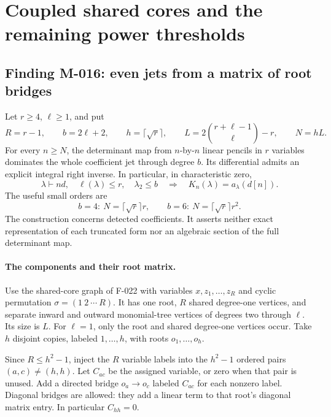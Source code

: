 \section{Coupled shared cores and the remaining power thresholds}

\subsection*{Finding M-016: even jets from a matrix of root bridges}
Let \(r\geq4\), \(\ell\geq1\), and put
\[
 R=r-1,\qquad b=2\ell+2,\qquad h=\lceil\sqrt r\rceil,
 \qquad
 L=2\binom{r+\ell-1}{\ell}-r,\qquad N=hL.
\]
For every \(n\geq N\), the determinant map from
\(n\)-by-\(n\) linear pencils in \(r\) variables dominates
the whole coefficient jet through degree \(b\).
Its differential admits an explicit integral right inverse.
In particular, in characteristic zero,
\begin{equation}\label{eq:M016K}
 \lambda\vdash nd,\quad\ell(\lambda)\leq r,\quad\lambda_2\leq b
       \quad\Longrightarrow\quad K_n(\lambda)=a_\lambda(d[n]).
\end{equation}
The useful small orders are
\[
       b=4:\ N=\lceil\sqrt r\rceil r,
       \qquad b=6:\ N=\lceil\sqrt r\rceil r^2.
                                                               \tag{M-016.1}
\]
The construction concerns detected coefficients. It asserts
neither exact representation of each truncated form nor
an algebraic section of the full determinant map.

\paragraph{The components and their root matrix.}
Use the shared-core graph of F-022 with variables
\(x,z_1,\ldots,z_R\) and cyclic permutation
\(\sigma=(1\ 2\ \cdots\ R)\). It has one root,
\(R\) shared degree-one vertices, and separate inward and
outward monomial-tree vertices of degrees two through \(\ell\).
Its size is \(L\). For \(\ell=1\), only the root and
shared degree-one vertices occur.
Take \(h\) disjoint copies, labeled \(1,\ldots,h\),
with roots \(o_1,\ldots,o_h\).

Since \(R\leq h^2-1\), inject the \(R\) variable labels
into the \(h^2-1\) ordered pairs \((a,c)\ne(h,h)\).
Let \(C_{ac}\) be the assigned variable, or zero when
that pair is unused. Add a directed bridge
\(o_a\longrightarrow o_c\) labeled \(C_{ac}\) for each
nonzero label. Diagonal bridges are allowed: they add a
linear term to that root's diagonal matrix entry.
In particular \(C_{hh}=0\).

